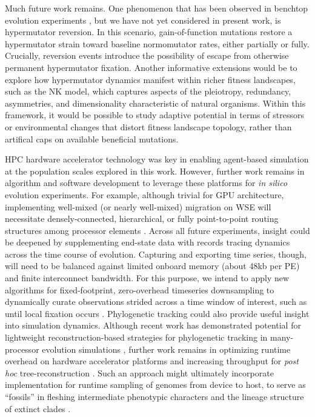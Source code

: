 Much future work remains.
One phenomenon that has been observed in benchtop evolution experiments \citep{ho2021evolutionary}, but we have not yet considered in present work, is hypermutator reversion.
In this scenario, gain-of-function mutations restore a hypermutator strain toward baseline normomutator rates, either partially or fully.
Crucially, reversion events introduce the possibility of escape from otherwise permanent hypermutator fixation.
Another informative extensions would be to explore how hypermutator dynamics manifest within richer fitness landscapes, such as the NK model, which captures aspects of the pleiotropy, redundancy, asymmetries, and dimensionality characteristic of natural organisms.
Within this framework, it would be possible to study adaptive potential in terms of stressors or environmental changes that distort fitness landscape topology, rather than artifical caps on available beneficial mutations.

HPC hardware accelerator technology was key in enabling agent-based simulation at the population scales explored in this work.
However, further work remains in algorithm and software development to leverage these platforms for \textit{in silico} evolution experiments.
For example, although trivial for GPU architecture, implementing well-mixed (or nearly well-mixed) migration on WSE will necessitate densely-connected, hierarchical, or fully point-to-point routing structures among processor elements \citep{james2020physical,luczynski2024near}.
Across all future experiments, insight could be deepened by supplementing end-state data with records tracing dynamics across the time course of evolution.
Capturing and exporting time series, though, will need to be balanced against limited onboard memory (about 48kb per PE) and finite interconnect bandwidth.
For this purpose, we intend to apply new algorithms for fixed-footprint, zero-overhead timeseries downsampling to dynamically curate observations strided across a time window of interest, such as until local fixation occurs \citep{moreno2024structured}.
Phylogenetic tracking could also provide useful insight into simulation dynamics.
Although recent work has demonstrated potential for lightweight reconstruction-based strategies for phylogenetic tracking in many-processor evolution simulations \citep{moreno2022hereditary}, further work remains in optimizing runtime overhead on hardware accelerator platforms and increasing throughput for \textit{post hoc} tree-reconstruction \citep{moreno2024trackable,moreno2024analysis}.
Such an approach might ultimately incorporate implementation for runtime sampling of genomes from device to host, to serve as ``fossils'' in fleshing intermediate phenotypic characters and the lineage structure of extinct clades \citep{moreno2024guide}.

